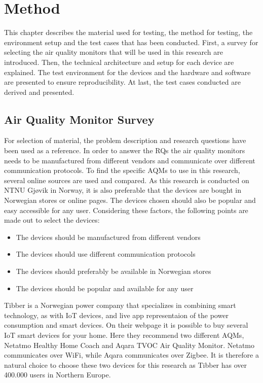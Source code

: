 \chapter{Method}
This chapter describes the material used for testing, the method for testing, the environment setup and the test cases that has been conducted. First, a survey for selecting the air quality monitors that will be used in this research are introduced. Then, the technical architecture and setup for each device are explained. The test environment for the devices and the hardware and software are presented to ensure reproducibility. At last, the test cases conducted are derived and presented. 
\section{Air Quality Monitor Survey}
For selection of material, the problem description and research questions have been used as a reference. In order to answer the RQs the air quality monitors needs to be manufactured from different vendors and communicate over different communication protocols. To find the specific AQMs to use in this research, several online sources are used and compared. As this research is conducted on NTNU Gjøvik in Norway, it is also preferable that the devices are bought in Norwegian stores or online pages. The devices chosen should also be popular and easy accessible for any user. Considering these factors, the following points are made out to select the devices:
\begin{itemize}
    \item The devices should be manufactured from different vendors
    \item The devices should use different communication protocols
    \item The devices should preferably be available in Norwegian stores
    \item The devices should be popular and available for any user
\end{itemize}
Tibber \cite{Tibber} is a Norwegian power company that specializes in combining smart technology, as with IoT devices, and live app representaion of the power consumption and smart devices. \cite{Tibber} On their webpage it is possible to buy several IoT smart devices for your home. Here they recommend two different AQMs, Netatmo Healthy Home Coach and Aqara TVOC Air Quality Monitor. Netatmo communicates over WiFi, while Aqara communicates over Zigbee. It is therefore a natural choice to choose these two devices for this research as Tibber has over 400.000 users in Northern Europe. \cite{TibberUsers}
